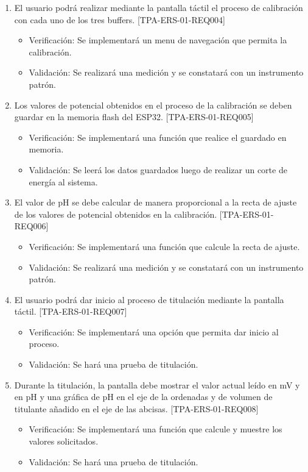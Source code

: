 \documentclass[11pt]{charter}
\begin{document}
\begin{enumerate}
\begin{enumerate}
\begin{itemize}
\end{itemize}
	\item El usuario podrá realizar mediante la pantalla táctil el proceso de calibración con cada uno de los tres buffers. [TPA-ERS-01-REQ004]
	\begin{itemize}
\item Verificación: Se implementará un menu de navegación que permita la calibración.\\
\item Validación: Se realizará una medición y se constatará con un instrumento patrón.\\
\end{itemize}
	\item Los valores de potencial obtenidos en el proceso de la calibración se deben guardar en la memoria flash del ESP32. [TPA-ERS-01-REQ005]
	\begin{itemize}
\item Verificación: Se implementará una función que realice el guardado en memoria.\\
\item Validación: Se leerá los datos guardados luego de realizar un corte de energía al sistema.\\
\end{itemize}
	\item El valor de pH se debe calcular de manera proporcional a la recta de ajuste de los valores de potencial obtenidos en la calibración. [TPA-ERS-01-REQ006]
	\begin{itemize}
\item Verificación: Se implementará una función que calcule la recta de ajuste.\\
\item Validación: Se realizará una medición y se constatará con un instrumento patrón.\\
\end{itemize}
	\item El usuario podrá dar inicio al proceso de titulación mediante la pantalla táctil. [TPA-ERS-01-REQ007]
	\begin{itemize}
\item Verificación: Se implementará una opción que permita dar inicio al proceso.\\
\item Validación: Se hará una prueba de titulación.\\
\end{itemize}
	\item Durante la titulación, la pantalla debe mostrar el valor actual leído en mV y en pH y una gráfica de pH en el eje de la ordenadas y de volumen de titulante añadido en el eje de las abcisas. [TPA-ERS-01-REQ008]
	\begin{itemize}
\item Verificación: Se implementará una función que calcule y muestre los valores solicitados.\\
\item Validación: Se hará una prueba de titulación.\\
\end{itemize}


\end{enumerate}
\end{enumerate}
\end{document}
